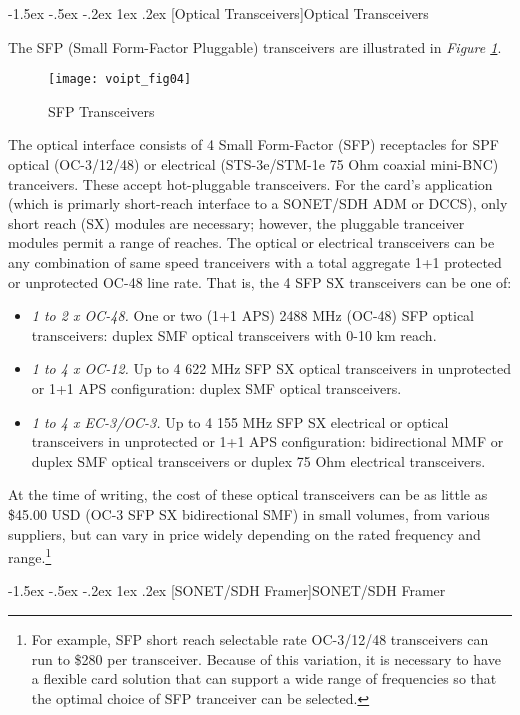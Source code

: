 \documentclass[letterpaper,final,notitlepage,twocolumn,10pt,twoside]{article}
\makeatletter
\let\normalsize = \small
\let\small = \footnotesize
\let\footnotesize = \scriptsize
\let\scriptsize = \tiny
\renewcommand\subsection{\@startsection{subsection}{2}{\z@}%
                                     {-1.5ex \@plus -.5ex \@minus -.2ex}%
                                     {1ex \@plus .2ex}%
                                     {\normalfont\normalsize\bfseries}}
\makeatother
\begin{document}
\subsection[Optical Transceivers]{Optical Transceivers}

The SFP (Small Form-Factor Pluggable) transceivers are illustrated in
\textsl{Figure \ref{figure:voipt_fig04}}.
\begin{figure}[htp]
\center\texttt{[image: voipt\_fig04]}
\caption[Tranceivers]{SFP Transceivers}
\label{figure:voipt_fig04}
\end{figure}
The optical interface consists of 4 Small Form-Factor (SFP) receptacles for SPF
optical (OC-3/12/48) or electrical (STS-3e/STM-1e 75 Ohm coaxial mini-BNC)
tranceivers.  These accept hot-pluggable transceivers.  For the card's
application (which is primarly short-reach interface to a SONET/SDH ADM or
DCCS), only short reach (SX) modules are necessary; however, the pluggable
tranceiver modules permit a range of reaches.  The optical or electrical
transceivers can be any combination of same speed tranceivers with a total
aggregate 1+1 protected or unprotected OC-48 line rate.
That is, the 4 SFP SX transceivers can be one of:
\begin{itemize}
\item \textsl{1 to 2 x OC-48.}
	One or two (1+1 APS) 2488 MHz (OC-48) SFP optical transceivers: duplex
	SMF optical transceivers with 0-10 km reach.
\item \textsl{1 to 4 x OC-12.}
	Up to 4 622 MHz SFP SX optical transceivers in unprotected or 1+1 APS
	configuration: duplex SMF optical transceivers.
\item \textsl{1 to 4 x EC-3/OC-3.}
	Up to 4 155 MHz SFP SX electrical or optical transceivers in unprotected
	or 1+1 APS configuration: bidirectional MMF or duplex SMF optical
	transceivers or duplex 75 Ohm electrical transceivers.
\end{itemize}
At the time of writing, the cost of these optical transceivers can be as little
as \$45.00 USD (OC-3 SFP SX bidirectional SMF) in small volumes, from various
suppliers, but can vary in price widely depending on the rated frequency and
range.\footnote{For example, SFP short reach selectable rate OC-3/12/48
transceivers can run to \$280 per transceiver.  Because of this variation, it
is necessary to have a flexible card solution that can support a wide range of
frequencies so that the optimal choice of SFP tranceiver can be selected.}

\subsection[SONET/SDH Framer]{SONET/SDH Framer}
\end{document}
